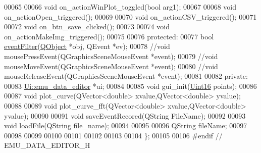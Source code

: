 \begin{DoxyCode}
00065 
00066     \textcolor{keywordtype}{void} on\_actionWinPlot\_toggled(\textcolor{keywordtype}{bool} arg1);
00067 
00068     \textcolor{keywordtype}{void} on\_actionOpen\_triggered();
00069 
00070     \textcolor{keywordtype}{void} on\_actionCSV\_triggered();
00071 
00072     \textcolor{keywordtype}{void} on\_btn\_save\_clicked();
00073 
00074     \textcolor{keywordtype}{void} on\_actionMakeImg\_triggered();
00075 
00076 \textcolor{keyword}{protected}:
00077     \textcolor{keywordtype}{bool} \hyperlink{a00008_a48f610d23d17b2679113ea351d0968e4}{eventFilter}(\hyperlink{a00059}{QObject} *obj, QEvent *ev);
00078     \textcolor{comment}{//void mousePressEvent(QGraphicsSceneMouseEvent *event);}
00079     \textcolor{comment}{//void mouseMoveEvent(QGraphicsSceneMouseEvent *event);}
00080     \textcolor{comment}{//void mouseReleaseEvent(QGraphicsSceneMouseEvent *event);}
00081 
00082 \textcolor{keyword}{private}:
00083     \hyperlink{a00009}{Ui::emu\_data\_editor} *ui;
00084 
00085     \textcolor{keywordtype}{void} gui\_init(\hyperlink{a00004_aae7407b021d43f7193a81a58cfb3e297}{Uint16} points);
00086 
00087     \textcolor{keywordtype}{void} plot\_curve(QVector<double> xvalue,QVector<double> yvalue);
00088 
00089     \textcolor{keywordtype}{void} plot\_curve\_fft(QVector<double> xvalue,QVector<double> yvalue);
00090 
00091     \textcolor{keywordtype}{void} saveEventRecored(QString FileName);
00092 
00093     \textcolor{keywordtype}{void} loadFile(QString file\_name);
00094 
00095 
00096     QString fileName;
00097 
00098 
00099 
00100 
00101 
00102 
00103 
00104 \};
00105 
00106 \textcolor{preprocessor}{#endif // EMU\_DATA\_EDITOR\_H}
\end{DoxyCode}
